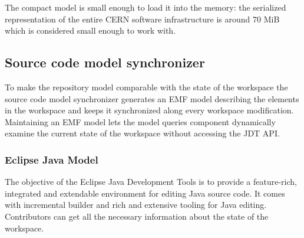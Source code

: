 The compact model is small enough to load it into the memory: the serialized
representation of the entire CERN software infrastructure is around 70 MiB which
is considered small enough to work with.

\subsection{Source code model synchronizer}
To make the repository model comparable with the state of the workspace the
source code model synchronizer generates an EMF model describing the elements
in the workspace and keeps it synchronized along every workspace modification.
Maintaining an EMF model lets the model queries component dynamically examine
the current state of the workspace without accessing the JDT API.

\subsubsection{Eclipse Java Model}
The objective of the Eclipse Java Development Tools \cite{JDT} is to provide a
feature-rich, integrated and extendable environment for editing Java source
code. It comes with incremental builder and rich and extensive tooling for Java
editing. Contributors can get all the necessary information about the state of the
workspace.

